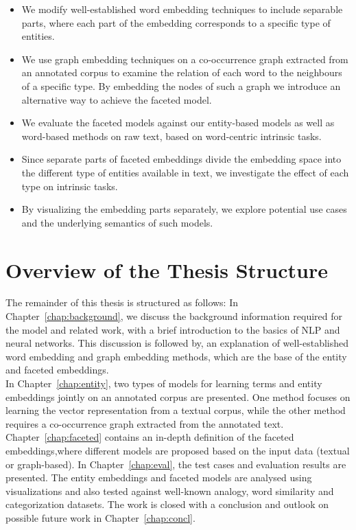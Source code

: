 \begin{itemize}
\item We modify well-established word embedding techniques to include separable parts, where each part of the embedding corresponds to a specific type of entities. 
\item We use graph embedding techniques on a co-occurrence graph extracted from an annotated corpus to examine the relation of each word to the neighbours of a specific type. By embedding the nodes of such a graph we introduce an alternative way to achieve the faceted model.
\item We evaluate the faceted models against our entity-based models as well as word-based methods on raw text, based on word-centric intrinsic tasks. 
\item Since separate parts of faceted embeddings divide the embedding space into the different type of entities available in text, we investigate the effect of each type on intrinsic tasks. 
\item By visualizing the embedding parts separately, we explore potential use cases and the underlying semantics of such models.   
\end{itemize}



\section{Overview of the Thesis Structure}
The remainder of this thesis is structured as follows: 
In Chapter~\ref{chap:background},  we discuss the background information required for the model and related work, with a brief introduction to the basics of NLP and neural networks. This discussion is followed by, an explanation of well-established word embedding and graph embedding methods, which are the base of the entity and faceted embeddings.\\
In Chapter~\ref{chap:entity}, two types of models for learning terms and entity embeddings jointly on an annotated corpus are presented. One method focuses on learning the vector representation from a textual corpus, while the other method requires a co-occurrence graph extracted from the annotated text.
Chapter~\ref{chap:faceted} contains an in-depth definition of the faceted embeddings,where different models are proposed based on the input data (textual or graph-based). 
In Chapter~\ref{chap:eval}, the test cases and evaluation results are presented. The entity embeddings and faceted models are analysed using visualizations and also tested against well-known analogy, word similarity and categorization datasets.
The work is closed with a conclusion and outlook on possible future work in Chapter~\ref{chap:concl}. 


